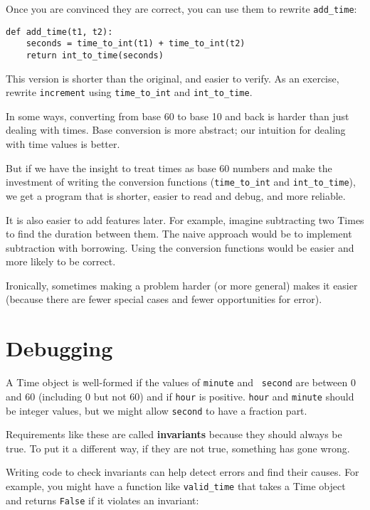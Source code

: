 \documentclass[10pt]{book}
\begin{document}
Once you are convinced they are correct, you can use them to 
rewrite \verb"add_time":

\begin{verbatim}
def add_time(t1, t2):
    seconds = time_to_int(t1) + time_to_int(t2)
    return int_to_time(seconds)
\end{verbatim}
%
This version is shorter than the original, and easier to verify.  As
an exercise, rewrite {\tt increment} using \verb"time_to_int" and
\verb"int_to_time".

In some ways, converting from base 60 to base 10 and back is harder
than just dealing with times.  Base conversion is more abstract; our
intuition for dealing with time values is better.

But if we have the insight to treat times as base 60 numbers and make
the investment of writing the conversion functions (\verb"time_to_int"
and \verb"int_to_time"), we get a program that is shorter, easier to
read and debug, and more reliable.

It is also easier to add features later.  For example, imagine
subtracting two Times to find the duration between them.  The
naive approach would be to implement subtraction with borrowing.
Using the conversion functions would be easier and more likely to be
correct.

Ironically, sometimes making a problem harder (or more general) makes it
easier (because there are fewer special cases and fewer opportunities
for error).


\section{Debugging}

A Time object is well-formed if the values of {\tt minute} and {\tt
second} are between 0 and 60 (including 0 but not 60) and if 
{\tt hour} is positive.  {\tt hour} and {\tt minute} should be
integer values, but we might allow {\tt second} to have a
fraction part.

Requirements like these are called {\bf invariants} because
they should always be true.  To put it a different way, if they
are not true, something has gone wrong.

Writing code to check invariants can help detect errors
and find their causes.  For example, you might have a function
like \verb"valid_time" that takes a Time object and returns
{\tt False} if it violates an invariant:
\end{document}
